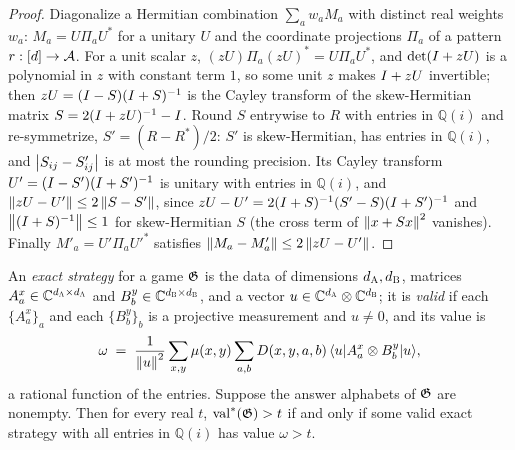 \begin{proof}
\leanok
Diagonalize a Hermitian combination $\sum_a w_a M_a$ with distinct real weights $w_a$:
$M_a = U \Pi_a U^*$ for a unitary $U$ and the coordinate projections $\Pi_a$ of a pattern
$r : [d] \to \cal A$. For a unit scalar $z$, $(zU) \Pi_a (zU)^* = U \Pi_a U^*$, and
$\det(\Id + zU)$ is a polynomial in $z$ with constant term $1$, so some unit $z$ makes
$\Id + zU$ invertible; then $zU = (\Id - S)(\Id + S)^{-1}$ is the Cayley transform of the
skew-Hermitian matrix $S = 2(\Id + zU)^{-1} - \Id$. Round $S$ entrywise to $R$ with entries
in $\mathbb{Q}(i)$ and re-symmetrize, $S' = (R - R^*)/2$: $S'$ is skew-Hermitian, has
entries in $\mathbb{Q}(i)$, and $\abs{S_{ij} - S'_{ij}}$ is at most the rounding
precision. Its Cayley transform $U' = (\Id - S')(\Id + S')^{-1}$ is unitary with entries
in $\mathbb{Q}(i)$, and $\norm{zU - U'} \leq 2 \norm{S - S'}$, since $zU - U' =
2(\Id + S)^{-1}(S' - S)(\Id + S')^{-1}$ and $\norm{(\Id + S)^{-1}} \leq 1$ for skew-Hermitian
$S$ (the cross term of $\norm{x + Sx}^2$ vanishes). Finally $M'_a = U' \Pi_a U'^*$
satisfies $\norm{M_a - M'_a} \leq 2 \norm{zU - U'}$.
\end{proof}

\begin{lemma}
\label{lem:rational-strategies-suffice}
\leanok
{}
An \emph{exact strategy} for a game $\game$ is the data of dimensions $d_\alice, d_\bob$,
matrices $A^x_a \in \C^{d_\alice \times d_\alice}$ and $B^y_b \in \C^{d_\bob \times
d_\bob}$, and a vector $u \in \C^{d_\alice} \ot \C^{d_\bob}$; it is \emph{valid} if each
$\{A^x_a\}_a$ and each $\{B^y_b\}_b$ is a projective measurement and $u \neq 0$, and its
value is
\[
  \omega \;=\; \frac{1}{\norm{u}^2} \sum_{x,y} \mu(x,y) \sum_{a,b} D(x,y,a,b)\,
  \bra{u} A^x_a \ot B^y_b \ket{u},
\]
a rational function of the entries. Suppose the answer alphabets of $\game$ are nonempty.
Then for every real $t$, $\valstar(\game) > t$ if and only if some valid exact strategy
with all entries in $\mathbb{Q}(i)$ has value $\omega > t$.
\end{lemma}

